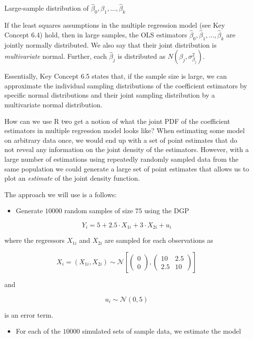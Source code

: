 \documentclass[]{book}
\providecommand{\tightlist}{%
  \setlength{\itemsep}{0pt}\setlength{\parskip}{0pt}}
\theoremstyle{definition}
\theoremstyle{definition}
\theoremstyle{definition}
\theoremstyle{remark}
\begin{document}
Large-sample distribution of
\(\hat\beta_0,\hat\beta_1,\dots,\hat\beta_k\)

If the least squares assumptions in the multiple regression model (see
Key Concept 6.4) hold, then in large samples, the OLS estimators
\(\hat\beta_0,\hat\beta_1,\dots,\hat\beta_k\) are jointly normally
distributed. We also say that their joint distribution is
\emph{multivariate} normal. Further, each \(\hat\beta_j\) is distributed
as \(N(\beta_j,\sigma_{\beta_j}^2)\).

Essentially, Key Concept 6.5 states that, if the sample size is large,
we can approximate the individual sampling distributions of the
coefficient estimators by specific normal distributions and their joint
sampling distribution by a multivariate normal distribution.

How can we use R two get a notion of what the joint PDF of the
coefficient estimators in multiple regression model looks like? When
estimating some model on arbitrary data once, we would end up with a set
of point estimates that do not reveal any information on the joint
density of the estimators. However, with a large number of estimations
using repeatedly randomly sampled data from the same population we could
generate a large set of point estimates that allows us to plot an
\emph{estimate} of the joint density function.

The approach we will use is a follows:

\begin{itemize}
\tightlist
\item
  Generate \(10000\) random samples of size \(75\) using the DGP
\end{itemize}

\[ Y_i = 5 + 2.5 \cdot X_{1i} + 3 \cdot X_{2i} + u_i  \]

where the regressors \(X_{1i}\) and \(X_{2i}\) are sampled for each
observations as

\[ X_i = (X_{1i}, X_{2i}) \sim \mathcal{N} \left[\begin{pmatrix} 0 \\ 0  \end{pmatrix}, \begin{pmatrix} 10 & 2.5 \\ 2.5 & 10 \end{pmatrix} \right] \]

and

\[ u_i \sim \mathcal{N}(0,5) \]

is an error term.

\begin{itemize}
\tightlist
\item
  For each of the \(10000\) simulated sets of sample data, we estimate
  the model
\end{itemize}
\end{document}
